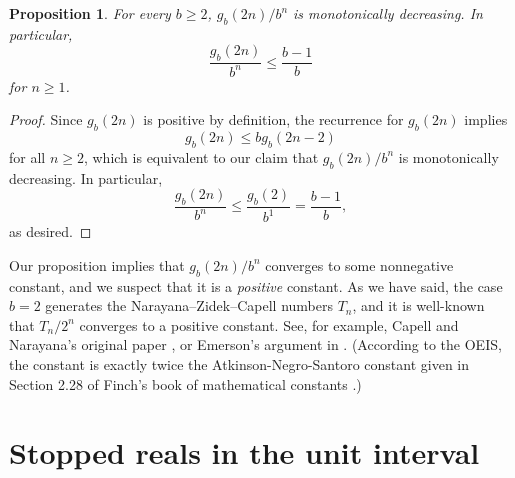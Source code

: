 \documentclass[12pt]{amsart}
\newcommand{\Z}{\mathbb{Z}}
\newtheorem{proposition}{Proposition}
\theoremstyle{definition}
\begin{document}
\begin{proposition}
    For every $b \geq 2$, $g_b(2n) / b^n$ is monotonically decreasing. In
    particular,
    \begin{equation*}
        \frac{g_b(2n)}{b^n} \leq \frac{b - 1}{b}
    \end{equation*}
    for $n \geq 1$.
\end{proposition}

\begin{proof}
    Since $g_b(2n)$ is positive by definition, the recurrence for $g_b(2n)$
    implies
    \begin{equation*}
        g_b(2n) \leq b g_b(2n - 2)
    \end{equation*}
    for all $n \geq 2$, which is equivalent to our claim that $g_b(2n) / b^n$
    is monotonically decreasing. In particular,
    \begin{equation*}
        \frac{g_b(2n)}{b^n} \leq \frac{g_b(2)}{b^1} = \frac{b - 1}{b},
    \end{equation*}
    as desired.
\end{proof}

Our proposition implies that $g_b(2n) / b^n$ converges to some nonnegative
constant, and we suspect that it is a \emph{positive} constant. As we have
said, the case $b = 2$ generates the Narayana--Zidek--Capell numbers $T_n$, and
it is well-known that $T_n / 2^n$ converges to a positive constant. See, for
example, Capell and Narayana's original paper \cite{capell1970knock}, or
Emerson's argument in \cite{emerson2006family}. (According to the OEIS, the
constant is exactly twice the Atkinson-Negro-Santoro constant given in Section
2.28 of Finch's book of mathematical constants \cite{finch2003mathematical}.)

\section{Stopped reals in the unit interval}
\label{sec:reals}


\end{document}

